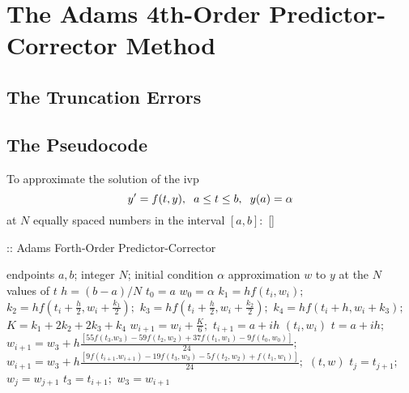 \documentclass[12pt,oneside]{book}
\begin{document}
		\clearpage
	\section{The Adams 4th-Order Predictor-Corrector Method} \label{m:ab4pc}
		\begin{spacing}{1.2}
			
			
			
			\subsection*{The Truncation Errors}
			
			
			\subsection*{The Pseudocode}
				To approximate the solution of the \ac{ivp} 
				\[ y' = f(t,y), \hspace*{0.2cm} a \leq t \leq b, \hspace*{0.2cm} y(a) = \alpha \]
				at $ N $ equally spaced numbers in the interval $ [a, b]: $ []
				
				\begin{algorithm}[H]
					\caption{:: Adams Forth-Order Predictor-Corrector}
					\begin{algorithmic}[1]
						\REQUIRE endpoints $ a, b $; \hspace*{0.2cm} integer $ N $; \hspace*{0.2cm} initial condition $ \alpha $
						\ENSURE approximation $ w $ to $ y $ at the $ N $ values of $ t $
						\STATE $ h = (b - a) / N $
						\STATE $ t_0 = a $
						\STATE $ w_0 = \alpha $
						\FOR{$ i = 0, 1, 2 $}
							\STATE $ k_1 = hf(t_{i}, w_{i}); $ 
							\STATE $ k_2 = hf(t_{i} + \frac{h}{2}, w_{i} + \frac{k_{1}}{2}); $
							\STATE $ k_3 = hf(t_{i} + \frac{h}{2}, w_{i} + \frac{k_{2}}{2}); $
							\STATE $ k_4 = hf(t_{i} + h, w_{i} + k_{3}); $
							\STATE $ K = k_{1} + 2k_{2} + 2k_{3} + k_{4} $
							\STATE $ w_{i+1} = w_{i} + \frac{K}{6}; $
							\STATE $ t_{i+1} = a + ih $
							\RETURN $ (t_{i}, w_{i}) $
						\ENDFOR
							\STATE $ t = a + ih; $
							\STATE $ w_{i+1} = w_{3} + h \frac{[ 55f(t_{3}. w_{3}) - 59f(t_{2}, w_{2}) + 37f(t_{1}, w_{1}) - 9f(t_{0}, w_{0}) ]}{24}; $ 
							\STATE $ w_{i+1} = w_{3} + h \frac{[ 9f(t_{i+1}. w_{i+1}) - 19f(t_{3}, w_{3}) - 5f(t_{2}, w_{2}) + f(t_{1}, w_{1}) ]}{24}; $ 
							\RETURN $ (t, w) $
								\STATE $ t_{j} = t_{j+1}; $
								\STATE $ w_{j} = w_{j+1} $
							\ENDFOR
							\STATE $ t_{3} = t_{i+1}; $
							\STATE $ w_{3} = w_{i+1} $
						\ENDFOR
					\end{algorithmic}
				\end{algorithm}
			
		\end{spacing}
		
\end{document}
